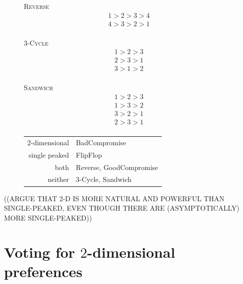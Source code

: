 \documentclass[12pt]{article}
\newcommand{\1}[1]{\mathds{1}[{#1}]}
\begin{document}
  \begin{figure}[h]
    \begin{minipage}{0.15\textwidth}
      \centering
      {\textsc{Reverse}}
      \begin{align*}
        1 > 2 > 3 > 4 \\
        4 > 3 > 2 > 1 \\
      \end{align*}
    \end{minipage}\hfill
    \begin{minipage}{0.15\textwidth}
      \centering
      {$3$-\textsc{Cycle}}
      \begin{align*}
        1 > 2 > 3 \\
        2 > 3 > 1 \\
        3 > 1 > 2 \\
      \end{align*}
    \end{minipage}\hfill
    \begin{minipage}{0.15\textwidth}
      \centering
      {\textsc{Sandwich}}
      \begin{align*}
        1 > 2 > 3 \\
        1 > 3 > 2 \\
        3 > 2 > 1 \\
        2 > 3 > 1 \\
      \end{align*}
    \end{minipage}\hfill
    \begin{minipage}{0.55\textwidth}
      \centering
      \begin{tabular}{ r | l }
        $2$-dimensional & {\sc BadCompromise} \\
        single peaked & {\sc FlipFlop} \\
        both & {\sc Reverse}, {\sc GoodCompromise} \\
        neither & $3$-{\sc Cycle}, {\sc Sandwich} \\
      \end{tabular}
    \end{minipage}\hfill


  \end{figure}



  ((ARGUE THAT 2-D IS MORE NATURAL AND POWERFUL THAN SINGLE-PEAKED,
  EVEN THOUGH THERE ARE (ASYMPTOTICALLY) MORE SINGLE-PEAKED))

\section{Voting for $2$-dimensional preferences}
\end{document}
